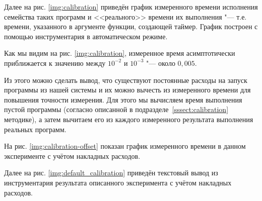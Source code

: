 Далее на рис. \ref{img:calibration} приведён график измеренного времени исполнения семейства таких программ и <<реального>> времени их выполнения "--- т.е. времени, указанного в аргументе функции, создающей таймер. График построен с помощью инструментария в автоматическом режиме.

\begin{figure}
\end{figure}

Как мы видим на рис. \ref{img:calibration}, измеренное время асимптотически приближается к значению между $10^{-2}$ и $10^{-3}$ "--- около $0,005$.

Из этого можно сделать вывод, что существуют постоянные расходы на запуск программы из нашей системы и их можно вычесть из измеренного времени для повышения точности измерения. Для этого мы вычисляем время выполнения пустой программы (согласно описанной в подразделе~\ref{sssect:calibration} методике), а затем вычитаем его из каждого измеренного результата выполнения реальных программ.

На рис. \ref{img:calibration-offset} показан график измеренного времени в данном эксперименте с учётом накладных расходов.

\begin{figure}
\end{figure}

Далее на рис. \ref{img:default_calibration} приведён текстовый вывод из инструментария результата описанного эксперимента с учётом накладных расходов.

